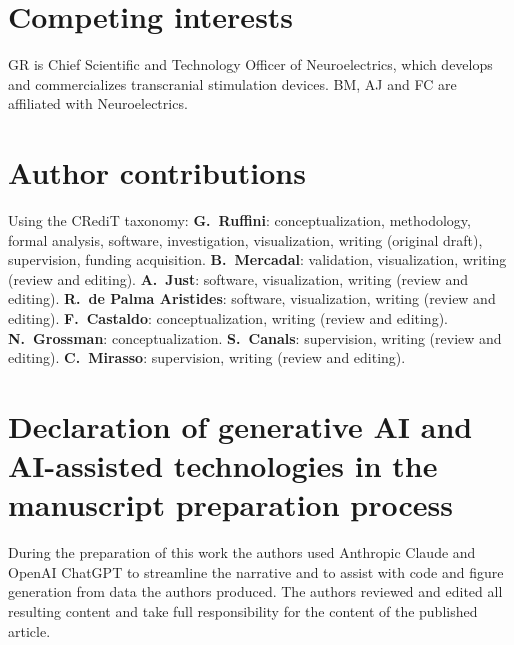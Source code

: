 \documentclass[11pt,a4paper]{article}
\begin{document}
\section*{Competing interests}
GR is Chief Scientific and Technology Officer of Neuroelectrics, which develops and
commercializes transcranial stimulation devices. BM, AJ and FC are affiliated with
Neuroelectrics.

\section*{Author contributions}
Using the CRediT taxonomy: \textbf{G.~Ruffini}: conceptualization, methodology, formal
analysis, software, investigation, visualization, writing (original draft), supervision,
funding acquisition. \textbf{B.~Mercadal}: validation, visualization, writing (review
and editing). \textbf{A.~Just}: software, visualization, writing (review and editing).
\textbf{R.~de Palma Aristides}: software, visualization, writing (review and editing).
\textbf{F.~Castaldo}: conceptualization, writing (review and editing).
\textbf{N.~Grossman}: conceptualization.
\textbf{S.~Canals}: supervision, writing (review and editing).
\textbf{C.~Mirasso}: supervision, writing (review and editing).
\fi

\section*{Declaration of generative AI and AI-assisted technologies in the manuscript
preparation process}
During the preparation of this work the authors used Anthropic Claude and OpenAI ChatGPT to
streamline the narrative and to assist with code and figure generation from data the authors
produced. The authors reviewed and edited all resulting content and take full responsibility
for the content of the published article.
\end{document}
